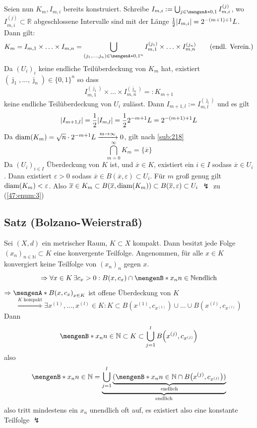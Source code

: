 \begin{description}
	Seien nun $K_m, I_{m,i}$ bereits konstruiert. Schreibe $I_{m,i} := \bigcup_{j \in \set{0,1} } I_{m,i}^{(j)}$, wo $I_{m,i}^{(j)} \subset \mathds{R}$ abgeschlossene
	Intervalle sind mit der Länge $\frac{1}{2} \lvert I_{m,i}\rvert = 2^{-(m+1)+1} L$. Dann gilt:
	\[
		K_m = I_{m,1} \times \ldots \times I_{m,n} = \bigcup_{(j_1, \ldots , j_n) \in \set{0,1}^n } I_{m,1}^{(j_1)} \times \ldots \times I_{m,n}^{(j_n)} \tag{endl. Verein.}
	\]
	Da $(U_i)_i$ keine endliche Teilüberdeckung von $K_m$ hat, existiert $(\bar \jmath_1, \ldots , \bar \jmath_n  ) \in \{ 0,1 \}^n$ so dass 
	\[
		I_{m,1}^{(\bar \jmath_1 )} \times \ldots \times I_{m,n}^{(\bar \jmath_n)} =: K_{m+1}
	\]
	keine endliche Teilüberdeckung von $U_i$ zulässt. Dann $I_{m+1, l} := I_{m,l}^{(\bar \jmath_l )}$ und es gilt
	\[
		\lvert I_{m+1,l}\rvert = \frac{1}{2} \lvert I_{m,l}\rvert = \frac{1}{2} 2^{-m+1} L = 2^{-(m+1) +1} L  
	\]
	Da $\operatorname{diam} (K_m) = \sqrt{n} \cdot 2^{-m+1} L  \xrightarrow{m \to \infty} 0  $, gilt nach \ref{sub:218} 
	\[
		\bigcap_{m=0}^{\infty} K_m = \{ \overline{x} \} 
	\]
	Da $(U_i)_{i\in I}$ Überdeckung von $K$ ist, und $\overline{x} \in K$, existiert ein $i \in I$ sodass $\overline{x} \in U_i$. Dann existiert $\varepsilon >0$ sodass 
	$\overline{x} \in B(\overline{x}, \varepsilon ) \subset U_i$. Für $m$ groß genug gilt $\operatorname{diam} (K_m) < \varepsilon$.  Also 
	$\overline{x} \in K_m \subset B(\overline{x} , \operatorname{diam}(K_m)) \subset B(\overline{x}, \varepsilon) \subset U_i $ {\large$\lightning$} zu  (\ref{47:enum:3}) \bewende
\end{description}

\subsection{Satz (Bolzano-Weierstraß)} %
\label{sub:48}
Sei $(X,d)$ ein metrischer Raum, $K \subset X$ kompakt. Dann besitzt jede Folge $(x_n)_{n \in \mathds{N}} \subset K$ eine konvergente Teilfolge.
Angenommen, für alle $x \in K$ konvergiert keine Teilfolge von $(x_n)_{n}$ gegen $x$.\\
\[
	\Rightarrow \forall x \in K \, \exists c_x >0 : B(x, c_x) \cap \set[x_n]{n \in \mathds{N} } \text{endlich}  
\]
$\Rightarrow  \set{B(x, c_x)}_{x \in K} $ ist offene Überdeckung von $K$ 
\[
	\stackrel{K \text{ kompakt}}{\Longrightarrow} \exists x^{(1)}, \ldots , x^{(l)} \in K : K \subset B(x^{(1)}, c_{x^{(1)}}) \cup \ldots \cup B(x^{(l)}, c_{x^{(l)}})
\]
Dann
\[
	\set[x_n]{n \in \mathds{N} } \subset K \subset \bigcup_{j=1}^{l} B\Big(x^{(j)}, c_{x^{(j)}}\Big) 
\]
also 
\[
	\set[x_n]{n \in \mathds{N}} =  \underbrace{\bigcup_{j=1}^{l} \underbrace{\enbrace{ \set[x_n]{n \in \mathds{N}} \cap B\big(x^{(j)}, c_{x^{(j)}}\big) }}_{\text{endlich}} }_{\text{endlich}}
\]
also tritt mindestens ein $x_n$ unendlich oft auf, es existiert also eine konstante Teilfolge {\large $\lightning$} \bewende

